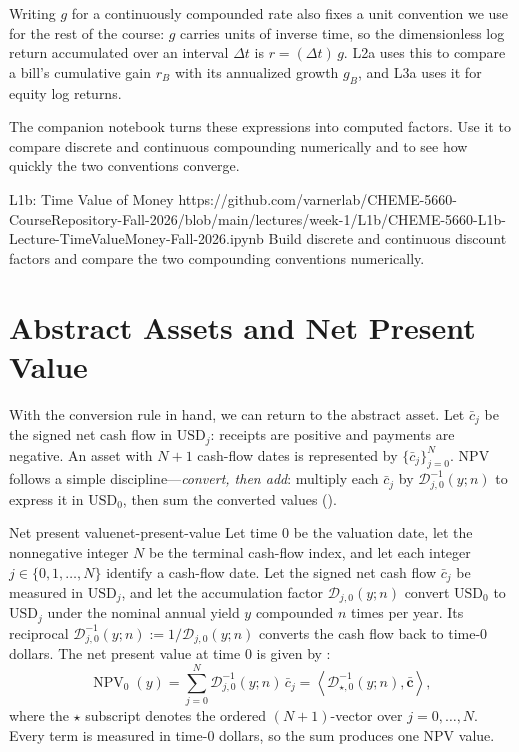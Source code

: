 \documentclass[11pt]{article}
\newcommand{\D}{\mathcal{D}}
\begin{document}
Writing $g$ for a continuously compounded rate also fixes a unit convention we use for the rest of the course: $g$ carries units of inverse time, so the dimensionless log return accumulated over an interval $\Delta t$ is $r=(\Delta t)\,g$. L2a uses this to compare a bill's cumulative gain $r_B$ with its annualized growth $g_B$, and L3a uses it for equity log returns.

The companion notebook turns these expressions into computed factors. Use it to compare discrete and continuous compounding numerically and to see how quickly the two conventions converge.

\notebooklink
  {L1b: Time Value of Money}
  {https://github.com/varnerlab/CHEME-5660-CourseRepository-Fall-2026/blob/main/lectures/week-1/L1b/CHEME-5660-L1b-Lecture-TimeValueMoney-Fall-2026.ipynb}
  {Build discrete and continuous discount factors and compare the two compounding conventions numerically.}

\section{Abstract Assets and Net Present Value}

With the conversion rule in hand, we can return to the abstract asset. Let $\bar c_j$ be the signed net cash flow in $\mathrm{USD}_j$: receipts are positive and payments are negative. An asset with $N+1$ cash-flow dates is represented by $\{\bar c_j\}_{j=0}^{N}$. NPV follows a simple discipline---\emph{convert, then add}: multiply each $\bar c_j$ by $\D_{j,0}^{-1}(y;n)$ to express it in $\mathrm{USD}_0$, then sum the converted values ().

\begin{definition}{Net present value}{net-present-value}
Let time $0$ be the valuation date, let the nonnegative integer $N$ be the terminal cash-flow index, and let each integer $j\in\{0,1,\ldots,N\}$ identify a cash-flow date. Let the signed net cash flow $\bar c_j$ be measured in $\mathrm{USD}_j$, and let the accumulation factor $\D_{j,0}(y;n)$ convert $\mathrm{USD}_0$ to $\mathrm{USD}_j$ under the nominal annual yield $y$ compounded $n$ times per year. Its reciprocal $\D_{j,0}^{-1}(y;n):=1/\D_{j,0}(y;n)$ converts the cash flow back to time-0 dollars. The net present value at time $0$ is given by :
\begin{equation}
  \label{eq:npv}
  \operatorname{NPV}_0(y)=\sum_{j=0}^{N}\D_{j,0}^{-1}(y;n)\,\bar c_j
  =\left\langle\D_{\star,0}^{-1}(y;n),\bar{\mathbf c}\right\rangle,
\end{equation}
where the $\star$ subscript denotes the ordered $(N+1)$-vector over $j=0,\ldots,N$. Every term is measured in time-0 dollars, so the sum produces one NPV value.
\end{definition}
\end{document}

